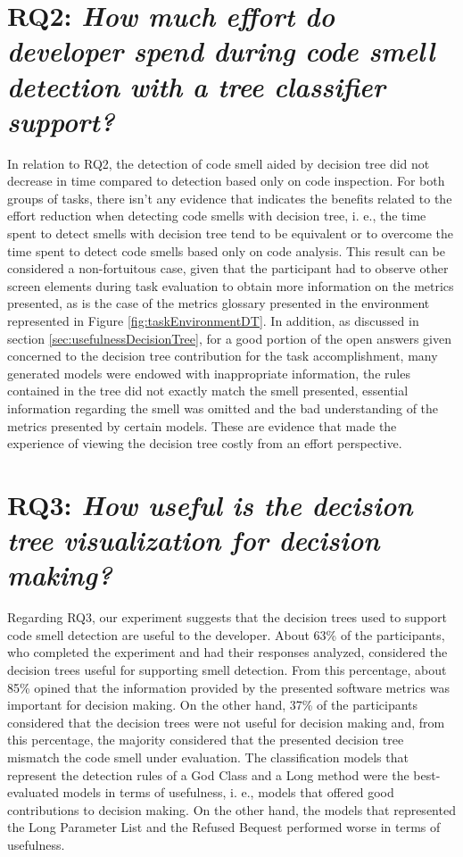 \section{\textbf{RQ2}: \textit{How much effort do developer spend during code smell detection with a tree classifier support?}}

In relation to RQ2, the detection of code smell aided by decision tree did not decrease in time compared to detection based only on code inspection. For both groups of tasks, there isn't any evidence that indicates the benefits related to the effort reduction when detecting code smells with decision tree, i. e., the time spent to detect smells with decision tree tend to be equivalent or to overcome the time spent to detect code smells based only on code analysis. This result can be considered a non-fortuitous case, given that the participant had to observe other screen elements during task evaluation to obtain more information on the metrics presented, as is the case of the metrics glossary presented in the environment represented in Figure \ref{fig:taskEnvironmentDT}. In addition, as discussed in section \ref{sec:usefulnessDecisionTree}, for a good portion of the open answers given concerned to the decision tree contribution for the task accomplishment, many generated models were endowed with inappropriate information, the rules contained in the tree did not exactly match the smell presented, essential information regarding the smell was omitted and the bad understanding of the metrics presented by certain models. These are evidence that made the experience of viewing the decision tree costly from an effort perspective.

\section{\textbf{RQ3}: \textit{How useful is the decision tree visualization for decision making?}}

Regarding RQ3, our experiment suggests that the decision trees used to support code smell detection are useful to the developer. About 63\% of the participants, who completed the experiment and had their responses analyzed, considered the decision trees useful for supporting smell detection. From this percentage, about 85\% opined that the information provided by the presented software metrics was important for decision making. On the other hand, 37\% of the participants considered that the decision trees were not useful for decision making and, from this percentage, the majority considered that the presented decision tree mismatch the code smell under evaluation. The classification models that represent the detection rules of a God Class and a Long method were the best-evaluated models in terms of usefulness, i. e., models that offered good contributions to decision making. On the other hand, the models that represented the Long Parameter List and the Refused Bequest performed worse in terms of usefulness.

